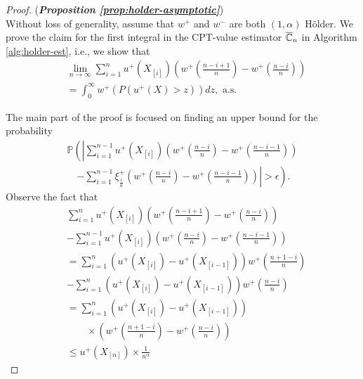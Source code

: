 \begin{proof}(\textbf{\textit{Proposition \ref{prop:holder-asymptotic}}})\ \\
Without loss of generality, assume that   $w^+$ and $w^-$ are both 
$(1, \alpha)$ H\"{o}lder.
We prove the claim for the first integral in the CPT-value estimator $\overline {\mathbb{C}}_n$ in Algorithm \ref{alg:holder-est}, i.e., we show  that 
\begin{align}
&\lim_{n\rightarrow \infty} \sum_{i=1}^{n} u^+\left(X_{[i]}\right) \left(w^+\left(\frac{n-i+1}{n}\right)- w^+\left(\frac{n-i}{n}\right)\right)\nonumber\\
&= \int_0^{\infty} w^+\left(P\left(u^+(X)>z\right)\right) dz , \text{ a.s.} 
\label{eq:claim11}
\end{align}


The main part of the proof is focused on finding an upper bound for the probability
\begin{align*}
\mathbb{P} \left( \left| \sum_{i=1}^{n-1} u^+\left(X_{[i]}\right)  \left(w^+\left(\frac{n-i}{n} \right)  - w^+\left(\frac{n-i-1}{n} \right) \right) \right.\right.\\
\quad\left.\left. -
\sum_{i=1}^{n-1} \xi^+_{\frac{i}{n}}  \left(w^+\left(\frac{n-i}{n} \right)  - w^+\left(\frac{n-i-1}{n} \right) \right) \right| >
\epsilon\right).
\end{align*}
Observe the fact that 
\begin{align*}
&\sum_{i=1}^{n} u^+\left(X_{[i]}\right) \left(w^+\left(\frac{n-i+1}{n}\right)- w^+\left(\frac{n-i}{n}\right)\right)\nonumber\\
&-\sum_{i=1}^{n-1} u^+\left(X_{[i]}\right) \left(w^+\left(\frac{n-i}{n}\right)- w^+\left(\frac{n-i-1}{n}\right)\right)\\
&=\sum_{i=1}^{n} \left(u^+\left(X_{[i]}\right) - u^+\left(X_{[i-1]}\right)\right) w^+\left(\frac{n+1-i}{n}\right)\\
&-\sum_{i=1}^{n} \left(u^+\left(X_{[i]}\right) - u^+\left(X_{[i-1]}\right)\right)w^+\left(\frac{n-i}{n}\right)\\
&=\sum_{i=1}^{n} \left(u^+\left(X_{[i]}\right) - u^+\left(X_{[i-1]}\right)\right)\\
&\qquad\times \left(w^+\left(\frac{n+1-i}{n}\right) 
-w^+\left(\frac{n-i}{n}\right)  \right) \\
&\leq u^+\left(X_{[n]}\right) \times \frac{1}{n^{\alpha}}
\end{align*}


\end{proof}
